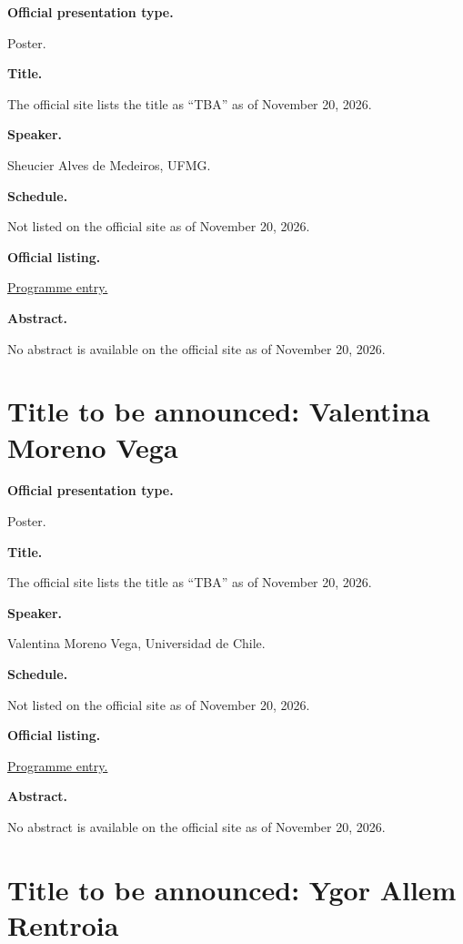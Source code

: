 \medskip\noindent
{\bf Official presentation type.}

Poster.

\medskip\noindent
{\bf Title.}

The official site lists the title as
``TBA'' as of November 20, 2026.

\medskip\noindent
{\bf Speaker.}

Sheucier Alves de Medeiros, UFMG.

\medskip\noindent
{\bf Schedule.}

Not listed on the official site as of
November 20, 2026.

\medskip\noindent
{\bf Official listing.}

\href{%
https://sites.google.com/view/%
geoalgcompluff/legal/%
legal-2027-resumos#h.f3btoqn8ykd7%
}{Programme entry.}

\medskip\noindent
{\bf Abstract.}

No abstract is available on the
official site as of November 20, 2026.

\section{Title to be announced: Valentina
Moreno Vega}
\label{section-tba-poster-vega}

\medskip\noindent
{\bf Official presentation type.}

Poster.

\medskip\noindent
{\bf Title.}

The official site lists the title as
``TBA'' as of November 20, 2026.

\medskip\noindent
{\bf Speaker.}

Valentina Moreno Vega, Universidad de Chile.

\medskip\noindent
{\bf Schedule.}

Not listed on the official site as of
November 20, 2026.

\medskip\noindent
{\bf Official listing.}

\href{%
https://sites.google.com/view/%
geoalgcompluff/legal/%
legal-2027-resumos#h.f3btoqn8ykd7%
}{Programme entry.}

\medskip\noindent
{\bf Abstract.}

No abstract is available on the
official site as of November 20, 2026.

\section{Title to be announced: Ygor Allem
Rentroia}
\label{section-tba-poster-rentroia}

